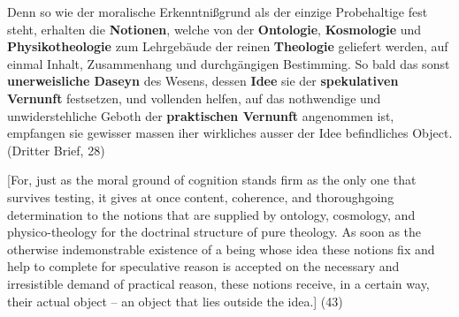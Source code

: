 Denn so wie der moralische Erkenntni\ss{}grund als der einzige Probehaltige fest steht, erhalten die \textbf{Notionen}, welche von der \textbf{Ontologie}, \textbf{Kosmologie} und \textbf{Physikotheologie} zum Lehrgeb\"{a}ude der reinen \textbf{Theologie} geliefert werden, auf einmal Inhalt, Zusammenhang und durchg\"{a}ngigen Bestimming. So bald das sonst \textbf{unerweisliche Daseyn }des Wesens, dessen \textbf{Idee} sie der \textbf{spekulativen Vernunft} festsetzen, und vollenden helfen, auf das nothwendige und unwiderstehliche Geboth der \textbf{praktischen Vernunft }angenommen ist, empfangen sie gewisser massen iher wirkliches ausser der Idee befindliches Object. (Dritter Brief, 28)

[For, just as the moral ground of cognition stands firm as the only one that survives testing, it gives at once content, coherence, and thoroughgoing determination to the notions that are supplied by ontology, cosmology, and physico{-}theology for the doctrinal structure of pure theology. As soon as the otherwise indemonstrable existence of a being whose idea these notions fix and help to complete for speculative reason is accepted on the necessary and irresistible demand of practical reason, these notions receive, in a certain way, their actual object {--} an object that lies outside the idea.] (43)

